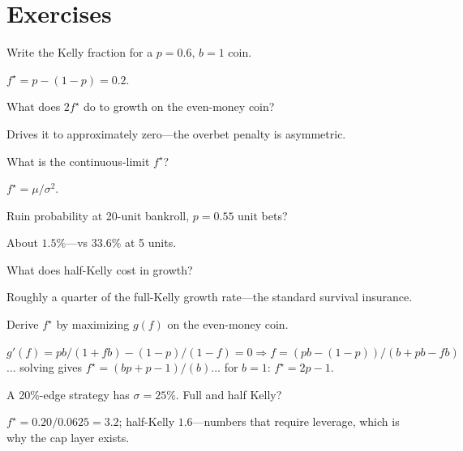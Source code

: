 \section{Exercises}
\begin{exercise}[easy]
Write the Kelly fraction for a $p{=}0.6$, $b{=}1$ coin.
\end{exercise}
\begin{solution}
$f^\star=p-(1-p)=0.2$.
\end{solution}

\begin{exercise}[easy]
What does $2f^\star$ do to growth on the even-money coin?
\end{exercise}
\begin{solution}
Drives it to approximately zero---the overbet penalty is asymmetric.
\end{solution}

\begin{exercise}[easy]
What is the continuous-limit $f^\star$?
\end{exercise}
\begin{solution}
$f^\star=\mu/\sigma^2$.
\end{solution}

\begin{exercise}[easy]
Ruin probability at 20-unit bankroll, $p{=}0.55$ unit bets?
\end{exercise}
\begin{solution}
About $1.5\%$---vs $33.6\%$ at 5 units.
\end{solution}

\begin{exercise}[easy]
What does half-Kelly cost in growth?
\end{exercise}
\begin{solution}
Roughly a quarter of the full-Kelly growth rate---the standard survival insurance.
\end{solution}

\begin{exercise}
Derive $f^\star$ by maximizing $g(f)$ on the even-money coin.
\end{exercise}
\begin{solution}
$g'(f)=pb/(1+fb)-(1-p)/(1-f)=0 \Rightarrow f=(pb-(1-p))/(b+p b-f b)$... solving gives
$f^\star=(bp+p-1)/(b)$... for $b{=}1$: $f^\star=2p-1$.
\end{solution}

\begin{exercise}
A 20\%-edge strategy has $\sigma{=}25\%$. Full and half Kelly?
\end{exercise}
\begin{solution}
$f^\star=0.20/0.0625=3.2$; half-Kelly $1.6$---numbers that require leverage, which is
why the cap layer exists.
\end{solution}

